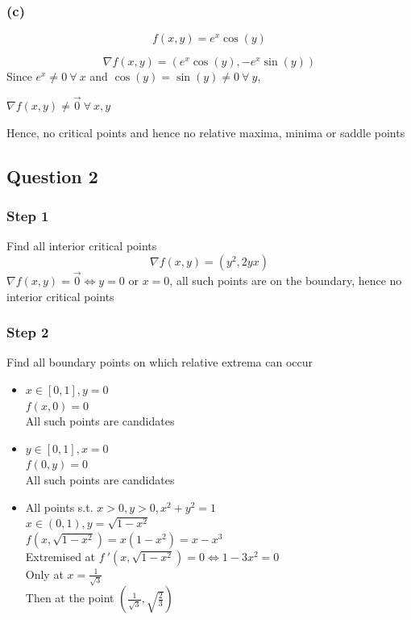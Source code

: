 \documentclass{article}
\begin{document}
\subsubsection*{(c)}
\[
f(x,y) = e^x \cos(y)
\]

\[
\nabla f(x,y) = (e^x \cos(y) , -e^x \sin(y))
\]
Since \(e^x \neq 0 \ \forall \ x\) and \(\cos(y) = \sin(y) \neq 0 \ \forall \ y\),

\(\nabla f(x,y) \neq \vec{0} \ \forall \ x,y\)

Hence, no critical points and hence no relative maxima, minima or saddle points

\subsection*{Question 2}
\subsubsection*{Step 1}
Find all interior critical points
\[
\nabla f(x,y) = (y^2, 2yx)
\]
\(\nabla f(x,y) = \vec{0} \iff y =0\) or \(x=0\), all such points are on the boundary, hence no interior critical points

\subsubsection*{Step 2}
Find all boundary points on which relative extrema can occur

\begin{itemize}
    \item \(x \in [0,1], y =0\) \\
    \(f(x,0) = 0\) \\
    All such points are candidates \\

    \item \(y \in [0,1], x=0\) \\
    \(f(0,y) = 0\) \\
    All such points are candidates \\

    \item All points s.t. \(x > 0, y> 0, x^2 + y^2 = 1\) \\
    \(x \in (0,1), y = \sqrt{1 - x^2}\) \\
    \(f(x,\sqrt{1-x^2}) = x(1-x^2) = x - x^3\) \\
    Extremised at \(f \ ' (x,\sqrt{1-x^2}) = 0 \iff 1 - 3x^2 = 0\) \\
    Only at \(x = \frac{1}{\sqrt{3}}\) \\
    Then at the point \(\left(\frac{1}{\sqrt{3}}, \sqrt{\frac{2}{3}}\right)\)
\end{itemize}
\end{document}

